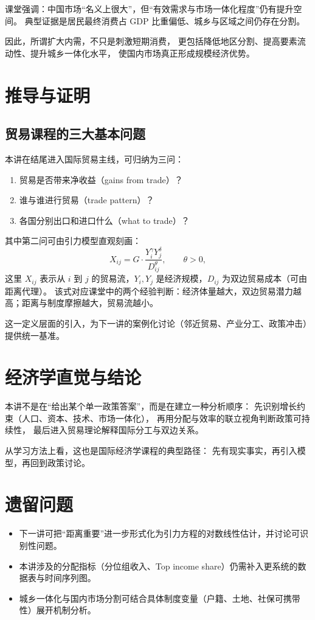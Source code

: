 \documentclass[UTF8,11pt,a4paper]{ctexart}
\begin{document}
课堂强调：中国市场“名义上很大”，但“有效需求与市场一体化程度”仍有提升空间。
典型证据是居民最终消费占 GDP 比重偏低、城乡与区域之间仍存在分割。

因此，所谓扩大内需，不只是刺激短期消费，
更包括降低地区分割、提高要素流动性、提升城乡一体化水平，
使国内市场真正形成规模经济优势。

\section{推导与证明}

\subsection{贸易课程的三大基本问题}

本讲在结尾进入国际贸易主线，可归纳为三问：
\begin{enumerate}
  \item 贸易是否带来净收益（gains from trade）？
  \item 谁与谁进行贸易（trade pattern）？
  \item 各国分别出口和进口什么（what to trade）？
\end{enumerate}

  其中第二问可由引力模型直观刻画：
\begin{equation}
  X_{ij} = G \cdot \frac{Y_i^{\gamma} Y_j^{\delta}}{D_{ij}^{\theta}}, \qquad \theta > 0,
\end{equation}
这里 $X_{ij}$ 表示从 $i$ 到 $j$ 的贸易流，$Y_i,Y_j$ 是经济规模，$D_{ij}$ 为双边贸易成本（可由距离代理）。
该式对应课堂中的两个经验判断：经济体量越大，双边贸易潜力越高；距离与制度摩擦越大，贸易流越小。

  这一定义层面的引入，为下一讲的案例化讨论（邻近贸易、产业分工、政策冲击）提供统一基准。

\section{经济学直觉与结论}

本讲不是在“给出某个单一政策答案”，而是在建立一种分析顺序：
先识别增长约束（人口、资本、技术、市场一体化），
再用分配与效率的联立视角判断政策可持续性，
最后进入贸易理论解释国际分工与双边关系。

从学习方法上看，这也是国际经济学课程的典型路径：
先有现实事实，再引入模型，再回到政策讨论。

\section{遗留问题}

\begin{itemize}
  \item 下一讲可把“距离重要”进一步形式化为引力方程的对数线性估计，并讨论可识别性问题。
  \item 本讲涉及的分配指标（分位组收入、Top income share）仍需补入更系统的数据表与时间序列图。
  \item 城乡一体化与国内市场分割可结合具体制度变量（户籍、土地、社保可携带性）展开机制分析。
\end{itemize}
\end{document}
